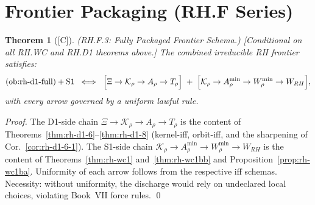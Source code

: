 \documentclass[12pt,oneside]{amsbook}
\theoremstyle{plain}
\newtheorem{theorem}{Theorem}[section]
\theoremstyle{definition}
\theoremstyle{remark}
\newcommand{\status}[1]{\textup{[#1]}}
\begin{document}
\section{Frontier Packaging (RH.F Series)}
\label{sec:rh-frontier}

\begin{theorem}[\status{C}]\label{thm:rh-f3}
\textup{(RH.F.3: Fully Packaged Frontier Schema.)}
\textup{[Conditional on all RH.WC and RH.D1 theorems above.]}
The combined irreducible RH frontier satisfies:
\[
 (\mathrm{ob{:}rh\text{-}d1\text{-}full}) + \mathrm{S1}
 \;\iff\;
 \Bigl[\Xi \to \mathcal{K}_\rho \to A_\rho \to T_\rho\Bigr]
 \;+\;
 \Bigl[\mathcal{K}_\rho \to A_\rho^{\min} \to W_\rho^{\min} \to W_{RH}\Bigr],
\]
with every arrow governed by a uniform lawful rule.
\end{theorem}

\begin{proof}
The D1-side chain $\Xi \to \mathcal{K}_\rho \to A_\rho \to T_\rho$
is the content of Theorems~\ref{thm:rh-d1-6}--\ref{thm:rh-d1-8}
(kernel-iff, orbit-iff, and the sharpening of
Cor.~\ref{cor:rh-d1-6-1}). The S1-side chain
$\mathcal{K}_\rho \to A_\rho^{\min} \to W_\rho^{\min} \to W_{RH}$
is the content of Theorems~\ref{thm:rh-wc1} and~\ref{thm:rh-wc1bb}
and Proposition~\ref{prop:rh-wc1ba}. Uniformity of each arrow
follows from the respective iff schemas. Necessity: without
uniformity, the discharge would rely on undeclared local choices,
violating Book~VII force rules. \qed
\end{proof}
\end{document}
